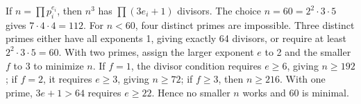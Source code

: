If $n=\prod p_i^{e_i}$, then $n^3$ has $\prod(3e_i+1)$ divisors. The choice $n=60=2^2\cdot3\cdot5$ gives $7\cdot4\cdot4=112$. For $n<60$, four distinct primes are impossible. Three distinct primes either have all exponents 1, giving exactly 64 divisors, or require at least $2^2\cdot3\cdot5=60$. With two primes, assign the larger exponent $e$ to 2 and the smaller $f$ to 3 to minimize $n$. If $f=1$, the divisor condition requires $e\ge6$, giving $n\ge192$; if $f=2$, it requires $e\ge3$, giving $n\ge72$; if $f\ge3$, then $n\ge216$. With one prime, $3e+1>64$ requires $e\ge22$. Hence no smaller $n$ works and $\boxed{60}$ is minimal.
